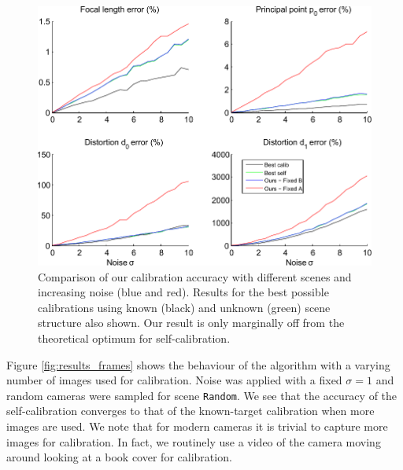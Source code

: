 \documentclass[10pt,twocolumn,letterpaper]{article}
\begin{document}
\begin{figure}
\centering
\includegraphics[width=\linewidth]{images/resultsPointNoise.pdf}
\caption{Comparison of our calibration accuracy with different scenes and increasing noise (blue and red). Results for the best possible calibrations using known (black) and unknown (green) scene structure also shown. Our result is only marginally off from the theoretical optimum for self-calibration.}
\label{fig:results_noise}
\end{figure}

Figure \ref{fig:results_frames} shows the behaviour of the algorithm with a varying number of images used for calibration. Noise was applied with a fixed $\sigma=1$ and random cameras were sampled for scene \texttt{Random}. We see that the accuracy of the self-calibration converges to that of the known-target calibration when more images are used. We note that for modern cameras it is trivial to capture more images for calibration. In fact, we routinely use a video of the camera moving around looking at a book cover for calibration.
\end{document}
